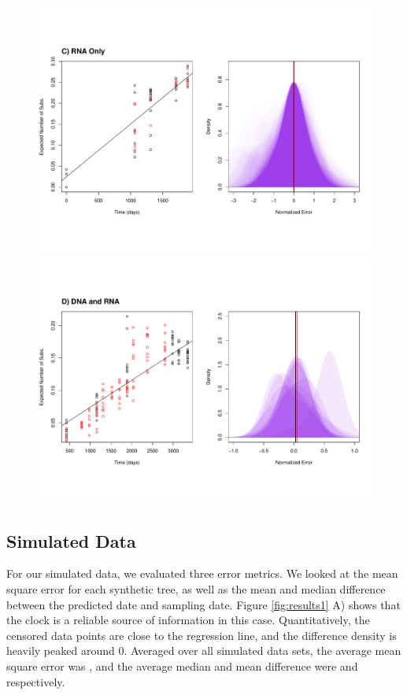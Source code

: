 \begin{figure}[!ht]
	\includegraphics[trim=0cm 0cm 0cm 7cm, clip=true,scale=0.425]{figures/ancre.pdf}\\
	\includegraphics[trim=0cm 4cm 0cm 7cm, clip=true,scale=0.425]{figures/lanl.pdf}
	\caption[Examples]{}
\end{figure}


\subsection{Simulated Data} \label{sec:sim_results}
For our simulated data, we evaluated three error metrics. We looked at the mean square error for each synthetic tree, as well as the mean and median difference between the predicted date and sampling date. Figure \ref{fig:results1} A) shows that the clock is a reliable source of information in this case. Quantitatively, the censored data points are close to the regression line, and the difference density is heavily peaked around 0. Averaged over all simulated data sets, the average mean square error was , and the average median and mean difference were  and  respectively.

